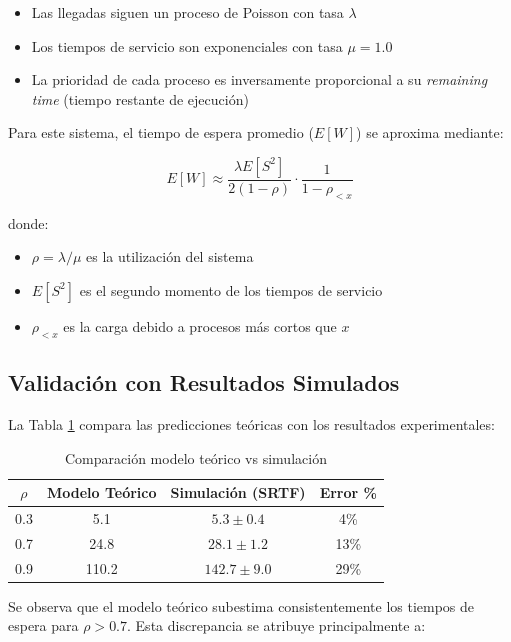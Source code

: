 \documentclass[12pt]{article}
\begin{document}
	\begin{itemize}
		\item Las llegadas siguen un proceso de Poisson con tasa $\lambda$
		\item Los tiempos de servicio son exponenciales con tasa $\mu = 1.0$
		\item La prioridad de cada proceso es inversamente proporcional a su \textit{remaining time} (tiempo restante de ejecución)
	\end{itemize}
	
	Para este sistema, el tiempo de espera promedio ($E[W]$) se aproxima mediante:
	
	\[
	E[W] \approx \frac{\lambda E[S^2]}{2(1 - \rho)} \cdot \frac{1}{1 - \rho_{<x}}
	\]
	
	donde:
	\begin{itemize}
		\item $\rho = \lambda/\mu$ es la utilización del sistema
		\item $E[S^2]$ es el segundo momento de los tiempos de servicio
		\item $\rho_{<x}$ es la carga debido a procesos más cortos que $x$
	\end{itemize}
	
	\subsection{Validación con Resultados Simulados}
	
	La Tabla \ref{tab:modelo_vs_simulacion} compara las predicciones teóricas con los resultados experimentales:
	
	\begin{table}[H]
		\centering
		\caption{Comparación modelo teórico vs simulación}
		\begin{tabular}{cccc}
			\toprule
			$\rho$ & Modelo Teórico & Simulación (SRTF) & Error \% \\
			\midrule
			0.3 & 5.1 & $5.3 \pm 0.4$ & 4\% \\
			0.7 & 24.8 & $28.1 \pm 1.2$ & 13\% \\
			0.9 & 110.2 & $142.7 \pm 9.0$ & 29\% \\
			\bottomrule
		\end{tabular}
		\label{tab:modelo_vs_simulacion}
	\end{table}
	
	Se observa que el modelo teórico subestima consistentemente los tiempos de espera para $\rho > 0.7$. Esta discrepancia se atribuye principalmente a:
	
\end{document}
